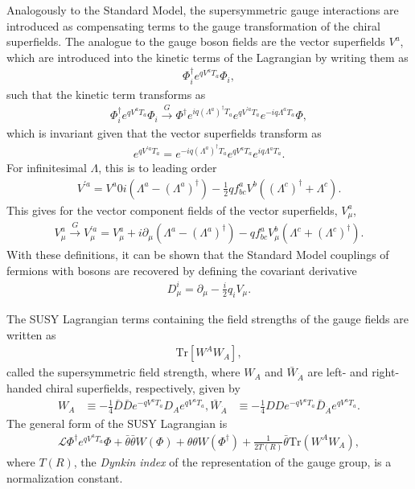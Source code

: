 \documentclass[twoside,english]{uiofysmaster}
\begin{document}
Analogously to the Standard Model, the supersymmetric gauge interactions are introduced as compensating terms to the gauge transformation of the chiral superfields. The analogue to the gauge boson fields are the vector superfields $V^a$, which are introduced into the kinetic terms of the Lagrangian by writing them as
\begin{align}
	\Phi^\dag_i e^{q V^a T_a}\Phi_i,
\end{align}
such that the kinetic term transforms as
\begin{align}
	\Phi_i^\dag e^{q V^a T_a}\Phi_i \overset{G}{\to} \Phi^\dag e^{iq(\Lambda^a)^\dag T_a}e^{qV^{'a}T_a}e^{-iq\Lambda^a T_a}\Phi,
\end{align}
which is invariant given that the vector superfields transform as
\begin{align}
	e^{qV^{'a} T_a} = e^{-iq(\Lambda^a)^\dag T_a}e^{qV^a T_a}e^{iq\Lambda^a T_a}.
\end{align}
For infinitesimal $\Lambda$, this is to leading order
\begin{align}
	V^{'a} = V^a 0 i(\Lambda^a - (\Lambda^a)^\dag) - \frac{1}{2}qf^a_{bc} V^b ((\Lambda^c)^\dag + \Lambda^c).
\end{align}
This gives for the vector component fields of the vector superfields, $V_\mu^a$,
\begin{align}
	V^a_\mu \overset{G}{\to} V^{'a}_\mu = V_\mu^a + i\partial_\mu(\Lambda^a - (\Lambda^a)^\dag) - qf^a_{bc} V_\mu^b (\Lambda^c + (\Lambda^{c})^\dag).
\end{align}
With these definitions, it can be shown that the Standard Model couplings of fermions with bosons are recovered by defining the covariant derivative
\begin{align}
	D_\mu^i = \partial_\mu - \frac{i}{2} q_i V_\mu.
\end{align}

The SUSY Lagrangian terms containing the field strengths of the gauge fields are written as
\begin{align}
	\mathrm{Tr}[W^A W_A],
\end{align}
called the supersymmetric field strength, where $W_A$ and $\bar W_{\dot A}$ are left- and right-handed chiral superfields, respectively, given by
\begin{align}
	W_A &\equiv -\frac{1}{4}\bar D\bar D e^{-qV^aT_a} D_A e^{qV^a T_a},
	\bar W_{\dot A} &\equiv -\frac{1}{4} D D e^{-qV^aT_a} \bar D_{\dot A} e^{qV^a T_a}.
\end{align}
The general form of the SUSY Lagrangian is
\begin{align}
	\mathcal{L} \Phi^\dag e^{qV^a T_a}\Phi + \bar\theta\bar\theta W(\Phi) + \theta\theta W(\Phi^\dag) + \frac{1}{2T(R)}\bar\theta \mathrm{Tr}(W^A W_A),
\end{align}
where $T(R)$, the {\it Dynkin index} of the representation of the gauge group, is a normalization constant.
\end{document}
